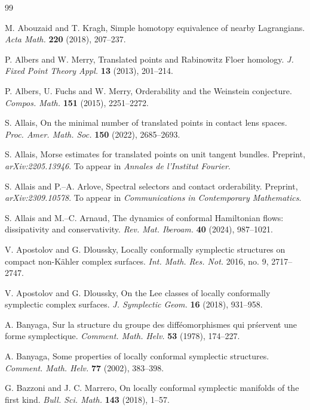 \documentclass{amsart}
\theoremstyle{remark}
\begin{document}
\begin{thebibliography}{99}

 M. Abouzaid and T. Kragh, Simple homotopy equivalence of nearby Lagrangians. \textit{Acta Math.} \textbf{220} (2018), 207--237.

 P. Albers and W. Merry, Translated points and Rabinowitz Floer homology. \textit{J. Fixed Point Theory Appl.} \textbf{13} (2013), 201--214.

 P. Albers, U. Fuchs and W. Merry, Orderability and the Weinstein conjecture. \textit{Compos. Math.} \textbf{151} (2015), 2251--2272.

 S. Allais, On the minimal number of translated points in contact lens spaces. \textit{Proc. Amer. Math. Soc.} \textbf{150} (2022), 2685--2693.

 S. Allais, Morse estimates for translated points on unit tangent bundles. Preprint, \textit{arXiv:2205.13946}. To appear in \textit{Annales de l'Institut Fourier}.

 S. Allais and P.--A. Arlove, Spectral selectors and contact orderability. Preprint, \textit{arXiv:2309.10578}. To appear in \textit{Communications in Contemporary Mathematics}.

 S. Allais and M.--C. Arnaud, The dynamics of conformal Hamiltonian flows: dissipativity and conservativity. \textit{Rev. Mat. Iberoam.} \textbf{40} (2024),  987--1021.

 V. Apostolov and G. Dloussky, Locally conformally symplectic structures on compact non-K\"ahler complex surfaces. \textit{Int. Math. Res. Not.} 2016, no. 9, 2717--2747.

 V. Apostolov and G. Dloussky, On the Lee classes of locally conformally symplectic complex surfaces. \textit{J. Symplectic Geom.} \textbf{16} (2018),  931--958.

 A. Banyaga, Sur la structure du groupe des diff\'eomorphismes qui pr\'servent une forme symplectique. \textit{Comment. Math. Helv.} \textbf{53} (1978), 174--227.
 
 A. Banyaga, Some properties of locally conformal symplectic structures. \textit{Comment. Math. Helv.} \textbf{77} (2002), 383--398.

 G. Bazzoni and J. C. Marrero, On locally conformal symplectic manifolds of the first kind. \textit{Bull. Sci. Math.} \textbf{143} (2018), 1--57.
 

\end{thebibliography}
\end{document}
